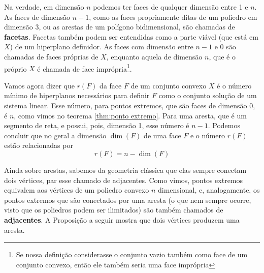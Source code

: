 Na verdade, em dimensão $n$ podemos ter faces de qualquer dimensão entre 1 e $n$. As faces de dimensão $n - 1$, como as faces propriamente ditas de um poliedro em dimensão 3, ou as arestas de um polígono bidimensional, são chamadas de \textbf{facetas}. Facetas também podem ser entendidas como a parte viável (que está em $X$) de um hiperplano definidor.  As faces com dimensão entre $n - 1$ e $0$ são chamadas de faces próprias de $X$, enquanto aquela de dimensão $n$, que é o próprio $X$ é chamada de face imprópria\footnote{Se nossa definição considerasse o conjunto vazio também como face de um conjunto convexo, então ele também seria uma face imprópria}.

Vamos agora dizer que $r(F)$ da face $F$ de um conjunto convexo $X$ é o número mínimo de hiperplanos necessários para definir $F$ como o conjunto solução de um sistema linear. Esse número, para pontos extremos, que são faces de dimensão 0, é $n$, como vimos no teorema \ref{thm:ponto extremo}. Para uma aresta, que é um segmento de reta, e possui, pois, dimensão 1, esse número é $n - 1$. Podemos concluir que no geral a dimensão $\dim(F)$ de uma face $F$ e o número $r(F)$ estão relacionadas por
\begin{equation*}
	r(F)= n - \dim(F)
\end{equation*} 

Ainda sobre arestas, sabemos da geometria clássica que elas sempre conectam dois vértices, par esse chamado de adjacentes. Como vimos, pontos extremos equivalem aos vértices de um poliedro convexo $n$ dimensional, e, analogamente, os pontos extremos que são conectados por uma aresta (o que nem sempre ocorre, visto que os poliedros podem ser ilimitados) são também chamados de \textbf{adjacentes}. A Proposição a seguir mostra que dois vértices produzem uma aresta.


